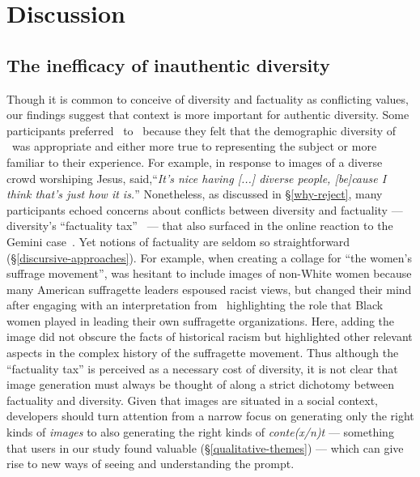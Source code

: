 \section{Discussion}
\label{discussion}

\subsection{The inefficacy of inauthentic diversity}
\label{inauthentic-diversity}


Though it is common to conceive of diversity and factuality as conflicting values, our findings suggest that context is more important for authentic diversity.
Some participants preferred \diverse~to \baseline~because they felt that the demographic diversity of \diverse~was appropriate and either more true to representing the subject or more familiar to their experience. 
For example, in response to images of a diverse crowd worshiping Jesus,  said,``\textit{It's nice having [...] diverse people, [be]cause I think that's just how it is.}'' Nonetheless, as discussed in \S\ref{why-reject}, many participants echoed concerns about conflicts between diversity and factuality --- diversity's ``factuality tax''~\cite{wang-etal-2023-t2iat} --- that also surfaced in the online reaction to the Gemini case~\cite{milmoandkern2024gemini, robertson2024google}. Yet notions of factuality are seldom so straightforward (\S\ref{discursive-approaches}).
For example, when creating a collage for ``the women's suffrage movement'',  was hesitant to include images of non-White women because many American suffragette leaders espoused racist views, but changed their mind after engaging with an interpretation from \agonistic~highlighting the role that Black women played in leading their own suffragette organizations. 
Here, adding the image did not obscure the facts of historical racism but highlighted other relevant aspects in the complex history of the suffragette movement.
Thus although the ``factuality tax'' is perceived as a necessary cost of diversity, it is not clear that image generation must always be thought of along a strict dichotomy between factuality and diversity.
Given that images are situated in a social context, developers should turn attention from a narrow focus on generating only the right kinds of  \textit{images} to also generating the right kinds of \textit{conte(x/n)t} --- something that users in our study found valuable (\S\ref{qualitative-themes}) --- which can give rise to new ways of seeing and understanding the prompt.

